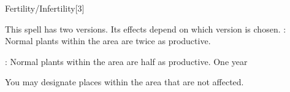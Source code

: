 \begin{spellsection}{Fertility/Infertility}[3]
    \begin{spellheader}
    \end{spellheader}
    \begin{spellcontent}
        \begin{spelltargetinginfo}
        \end{spelltargetinginfo}
        \begin{spelleffects}

            \spellspecial This spell has two versions. Its effects depend on which version is chosen.
            : Normal plants within the area are twice as productive.
            \par {}: Normal plants within the area are half as productive.
            \spelldur One year
        \end{spelleffects}
    \end{spellcontent}
    \begin{spellfooter}
        \spellnotes You may designate places within the area that are not affected.
    \end{spellfooter}
\end{spellsection}

